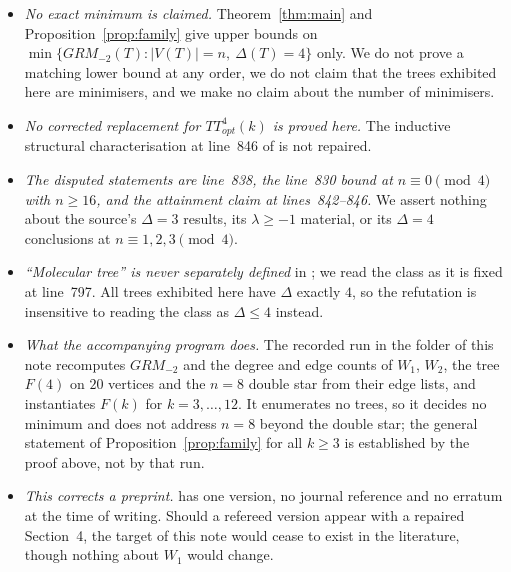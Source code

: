 \documentclass[11pt]{amsart}
\begin{document}
\begin{itemize}
\item \emph{No exact minimum is claimed.} Theorem~\ref{thm:main} and
      Proposition~\ref{prop:family} give upper bounds on
      $\min\{GRM_{-2}(T):|V(T)|=n,\ \Delta(T)=4\}$ only. We do not prove a matching lower
      bound at any order, we do not claim that the trees exhibited here are minimisers, and we
      make no claim about the number of minimisers.
\item \emph{No corrected replacement for $TT^4_{opt}(k)$ is proved here.} The inductive
      structural characterisation at line~846 of \cite{BasicIlic} is not repaired.
\item \emph{The disputed statements are line~838, the line~830 bound at $n\equiv0\pmod4$ with
      $n\ge16$, and the attainment claim at lines~842--846.} We assert nothing about the
      source's $\Delta=3$ results, its $\lambda\ge-1$ material, or its $\Delta=4$ conclusions
      at $n\equiv 1,2,3\pmod 4$.
\item \emph{``Molecular tree'' is never separately defined} in \cite{BasicIlic}; we read the
      class as it is fixed at line~797. All trees exhibited here have $\Delta$ exactly $4$, so
      the refutation is insensitive to reading the class as $\Delta\le 4$ instead.
\item \emph{What the accompanying program does.} The recorded run in the folder of this note
      recomputes $GRM_{-2}$ and the degree and edge counts of $W_1$, $W_2$, the tree $F(4)$ on
      $20$ vertices and the $n=8$ double star from their edge lists, and instantiates $F(k)$
      for $k=3,\dots,12$. It enumerates no trees, so it decides no minimum and does not
      address $n=8$ beyond the double star; the general statement of
      Proposition~\ref{prop:family} for all $k\ge 3$ is established by the proof above, not by
      that run.
\item \emph{This corrects a preprint.} \cite{BasicIlic} has one version, no journal reference
      and no erratum at the time of writing. Should a refereed version appear with a repaired
      Section~4, the target of this note would cease to exist in the literature, though nothing
      about $W_1$ would change.
\end{itemize}
\end{document}
